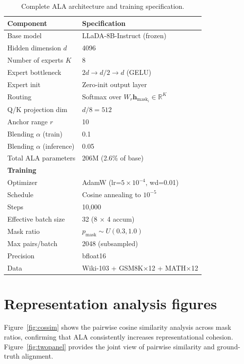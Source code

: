 \documentclass{article} %
\newcommand{\pmask}{p_{\text{mask}}}
\newcommand{\hmask}{\mathbf{h}_{\text{mask}}}
\begin{document}
\begin{table}[h]
\begin{center}
\begin{tabular}{ll}
\toprule
\textbf{Component} & \textbf{Specification} \\
\midrule
Base model & LLaDA-8B-Instruct (frozen) \\
Hidden dimension $d$ & 4096 \\
Number of experts $K$ & 8 \\
Expert bottleneck & $2d \to d/2 \to d$ (GELU) \\
Expert init & Zero-init output layer \\
Routing & Softmax over $W_r \hmask_i \in \mathbb{R}^K$ \\
Q/K projection dim & $d/8 = 512$ \\
Anchor range $r$ & 10 \\
Blending $\alpha$ (train) & 0.1 \\
Blending $\alpha$ (inference) & 0.05 \\
Total ALA parameters & 206M (2.6\% of base) \\
\midrule
\textbf{Training} & \\
\midrule
Optimizer & AdamW (lr=$5{\times}10^{-4}$, wd=0.01) \\
Schedule & Cosine annealing to $10^{-5}$ \\
Steps & 10,000 \\
Effective batch size & 32 (8 $\times$ 4 accum) \\
Mask ratio & $\pmask \sim U(0.3, 1.0)$ \\
Max pairs/batch & 2048 (subsampled) \\
Precision & bfloat16 \\
Data & Wiki-103 + GSM8K$\times$12 + MATH$\times$12 \\
\bottomrule
\end{tabular}
\end{center}
\caption{Complete ALA architecture and training specification.}\label{tab:arch}
\end{table}

\section{Representation analysis figures}
\label{app:repr}

Figure~\ref{fig:cossim} shows the pairwise cosine similarity analysis across mask ratios, confirming that ALA consistently increases representational cohesion.
Figure~\ref{fig:twopanel} provides the joint view of pairwise similarity and ground-truth alignment.
\end{document}
